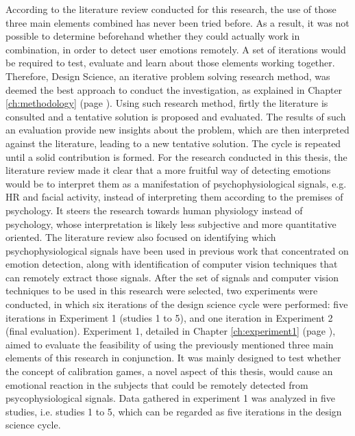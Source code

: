 According to the literature review conducted for this research, the use of those three main elements combined has never been tried before. As a result, it was not possible to determine beforehand whether they could actually work in combination, in order to detect user emotions remotely. A set of iterations would be required to test, evaluate and learn about those elements working together. Therefore, Design Science, an iterative problem solving research method, was deemed the best approach to conduct the investigation, as explained in Chapter \ref{ch:methodology} (page \pageref{ch:methodology}). Using such research method, firtly the literature is consulted and a tentative solution is proposed and evaluated. The results of such an evaluation provide new insights about the problem, which are then interpreted against the literature, leading to a new tentative solution. The cycle is repeated until a solid contribution is formed. For the research conducted in this thesis, the literature review made it clear that a more fruitful way of detecting emotions would be to interpret them as a manifestation of psychophysiological signals, e.g. HR and facial activity, instead of interpreting them according to the premises of psychology. It steers the research towards human physiology instead of psychology, whose interpretation is likely less subjective and more quantitative oriented. The literature review also focused on identifying which psychophysiological signals have been used in previous work that concentrated on emotion detection, along with identification of computer vision techniques that can remotely extract those signals. After the set of signals and computer vision techniques to be used in this research were selected, two experiments were conducted, in which six iterations of the design science cycle were performed: five iterations in Experiment 1 (studies 1 to 5), and one iteration in Experiment 2 (final evaluation). Experiment 1, detailed in Chapter \ref{ch:experiment1} (page \pageref{ch:experiment1}), aimed to evaluate the feasibility of using the previously mentioned three main elements of this research in conjunction. It was mainly designed to test whether the concept of calibration games, a novel aspect of this thesis, would cause an emotional reaction in the subjects that could be remotely detected from psycophysiological signals. Data gathered in experiment 1 was analyzed in five studies, i.e. studies 1 to 5, which can be regarded as five iterations in the design science cycle.

